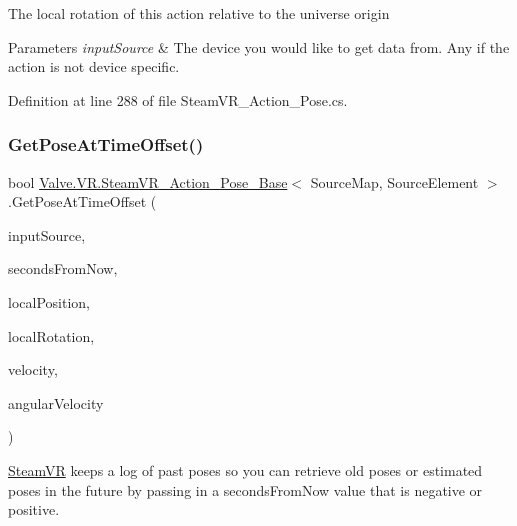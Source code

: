 The local rotation of this action relative to the universe origin 


\begin{DoxyParams}{Parameters}
{\em input\+Source} & The device you would like to get data from. Any if the action is not device specific.\\
\hline
\end{DoxyParams}


Definition at line 288 of file Steam\+V\+R\+\_\+\+Action\+\_\+\+Pose.\+cs.

\mbox{\label{class_valve_1_1_v_r_1_1_steam_v_r___action___pose___base_a0edda26e08e24b20fe9f1bb2941ba4a6}} 
\subsubsection{\texorpdfstring{GetPoseAtTimeOffset()}{GetPoseAtTimeOffset()}}
{\footnotesize\ttfamily bool \mbox{\hyperlink{class_valve_1_1_v_r_1_1_steam_v_r___action___pose___base}{Valve.\+V\+R.\+Steam\+V\+R\+\_\+\+Action\+\_\+\+Pose\+\_\+\+Base}}$<$ Source\+Map, Source\+Element $>$.Get\+Pose\+At\+Time\+Offset (\begin{DoxyParamCaption}\item[{\mbox{\hyperlink{namespace_valve_1_1_v_r_a82e5bf501cc3aa155444ee3f0662853f}{Steam\+V\+R\+\_\+\+Input\+\_\+\+Sources}}}]{input\+Source,  }\item[{float}]{seconds\+From\+Now,  }\item[{out Vector3}]{local\+Position,  }\item[{out Quaternion}]{local\+Rotation,  }\item[{out Vector3}]{velocity,  }\item[{out Vector3}]{angular\+Velocity }\end{DoxyParamCaption})}



\mbox{\hyperlink{class_valve_1_1_v_r_1_1_steam_v_r}{Steam\+VR}} keeps a log of past poses so you can retrieve old poses or estimated poses in the future by passing in a seconds\+From\+Now value that is negative or positive. 


